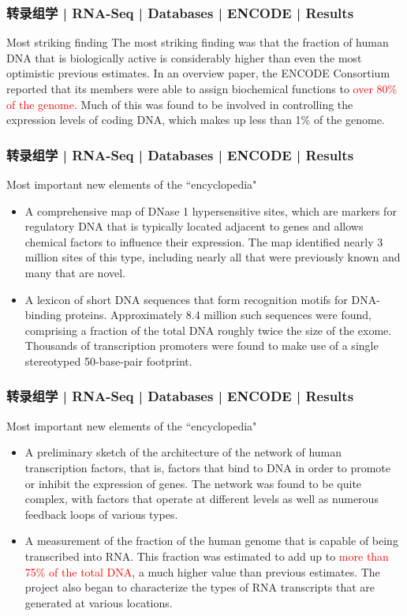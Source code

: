 \begin{frame}
  \frametitle{转录组学 | RNA-Seq | Databases | ENCODE | Results}
  \begin{block}{Most striking finding}
    The most striking finding was that the fraction of human DNA that is biologically active is considerably higher than even the most optimistic previous estimates. In an overview paper, the ENCODE Consortium reported that its members were able to assign biochemical functions to \textcolor{red}{over 80\% of the genome}. Much of this was found to be involved in controlling the expression levels of coding DNA, which makes up less than 1\% of the genome.
  \end{block}
\end{frame}

\begin{frame}
  \frametitle{转录组学 | RNA-Seq | Databases | ENCODE | Results}
  \begin{block}{Most important new elements of the ``encyclopedia"}
    \begin{itemize}
      \item A comprehensive map of DNase 1 hypersensitive sites, which are markers for regulatory DNA that is typically located adjacent to genes and allows chemical factors to influence their expression. The map identified nearly 3 million sites of this type, including nearly all that were previously known and many that are novel.
      \item A lexicon of short DNA sequences that form recognition motifs for DNA-binding proteins. Approximately 8.4 million such sequences were found, comprising a fraction of the total DNA roughly twice the size of the exome. Thousands of transcription promoters were found to make use of a single stereotyped 50-base-pair footprint.
    \end{itemize}
  \end{block}
\end{frame}

\begin{frame}
  \frametitle{转录组学 | RNA-Seq | Databases | ENCODE | Results}
  \begin{block}{Most important new elements of the ``encyclopedia"}
    \begin{itemize}
      \item A preliminary sketch of the architecture of the network of human transcription factors, that is, factors that bind to DNA in order to promote or inhibit the expression of genes. The network was found to be quite complex, with factors that operate at different levels as well as numerous feedback loops of various types.
      \item A measurement of the fraction of the human genome that is capable of being transcribed into RNA. This fraction was estimated to add up to \textcolor{red}{more than 75\% of the total DNA}, a much higher value than previous estimates. The project also began to characterize the types of RNA transcripts that are generated at various locations.
    \end{itemize}
  \end{block}
\end{frame}

